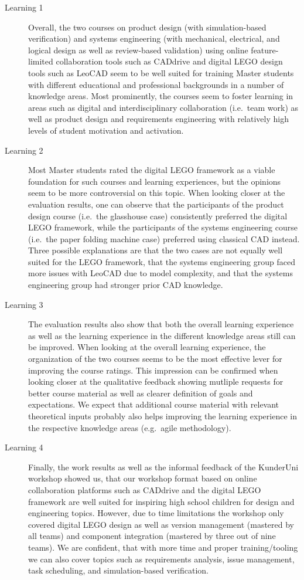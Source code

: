\documentclass{PDS}
\begin{document}
\begin{description}
    \item[Learning 1]
    Overall, the two courses on product design (with simulation-based verification) and systems engineering (with mechanical, electrical, and logical design as well as review-based validation) using online feature-limited collaboration tools such as CADdrive and digital LEGO design tools such as LeoCAD seem to be well suited for training Master students with different educational and professional backgrounds in a number of knowledge areas. Most prominently, the courses seem to foster learning in areas such as digital and interdisciplinary collaboration (i.e.\ team work) as well as product design and requirements engineering with relatively high levels of student motivation and activation.
    \item[Learning 2]
    Most Master students rated the digital LEGO framework as a viable foundation for such courses and learning experiences, but the opinions seem to be more controversial on this topic.
    When looking closer at the evaluation results, one can observe that the participants of the product design course (i.e.\ the glasshouse case) consistently preferred the digital LEGO framework, while the participants of the systems engineering course (i.e.\ the paper folding machine case) preferred using classical CAD instead.
    Three possible explanations are that the two cases are not equally well suited for the LEGO framework, that the systems engineering group faced more issues with LeoCAD due to model complexity, and that the systems engineering group had stronger prior CAD knowledge.
    \item[Learning 3]
    The evaluation results also show that both the overall learning experience as well as the learning experience in the different knowledge areas still can be improved.
    When looking at the overall learning experience, the organization of the two courses seems to be the most effective lever for improving the course ratings.
    This impression can be confirmed when looking closer at the qualitative feedback showing mutliple requests for better course material as well as clearer definition of goals and expectations.
    We expect that additional course material with relevant theoretical inputs probably also helps improving the learning experience in the respective knowledge areas (e.g.\ agile methodology).
    \item[Learning 4]
    Finally, the work results as well as the informal feedback of the KunderUni workshop showed us, that our workshop format based on online collaboration platforms such as CADdrive and the digital LEGO framework are well suited for inspiring high school children for design and engineering topics.
    However, due to time limitations the workshop only covered digital LEGO design as well as version management (mastered by all teams) and component integration (mastered by three out of nine teams).
    We are confident, that with more time and proper training/tooling we can also cover topics such as requirements analysis, issue management, task scheduling, and simulation-based verification.
\end{description}
\end{document}
